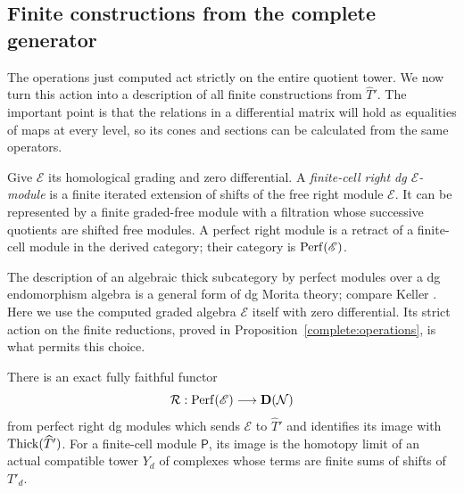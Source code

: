 \subsection{Finite constructions from the complete generator}

The operations just computed act strictly on the entire quotient
tower. We now turn this action into a description of all finite
constructions from $\widehat T'$. The important point is that the
relations in a differential matrix will hold as equalities of maps
at every level, so its cones and sections can be calculated from the
same operators.

Give $\mathscr E$ its homological grading and zero differential. A
\emph{finite-cell right dg $\mathscr E$-module} is a finite iterated
extension of shifts of the free right module $\mathscr E$. It can be
represented by a finite graded-free module with a filtration whose
successive quotients are shifted free modules. A perfect right module
is a retract of a finite-cell module in the derived category; their
category is $\operatorname{Perf}(\mathscr E)$.

The description of an algebraic thick subcategory by perfect modules
over a dg endomorphism algebra is a general form of dg Morita theory;
compare Keller \cite[Section~3.6 and Theorem~3.8(b)]{Keller2006}.
Here we use the computed graded algebra $\mathscr E$ itself with zero
differential. Its strict action on the finite reductions, proved in
Proposition~\ref{complete:operations}, is what permits this choice.

\begin{proposition}
\label{complete:realization}
There is an exact fully faithful functor
\[
 \mathcal R:\operatorname{Perf}(\mathscr E)\longrightarrow\mathbf D(\mathcal N)
\]
from perfect right dg modules which sends $\mathscr E$ to
$\widehat T'$ and identifies its image with
$\operatorname{Thick}(\widehat T')$. For a finite-cell module $\mathsf P$, its
image is the homotopy limit of an actual compatible tower $Y_d$ of
complexes whose terms are finite sums of shifts of $T'_d$.
\end{proposition}


